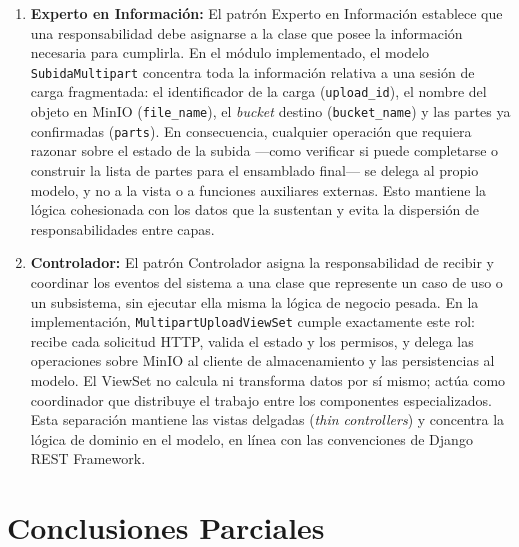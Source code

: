 \begin{enumerate}
\begin{lstlisting}[language=Python, caption={Validación de transiciones de estado}]
if upload.status == 'completed' or upload.status == 'cancelada':
    return Response({"error": "Subida culminada"},
                    status=status.HTTP_400_BAD_REQUEST)
\end{lstlisting}

  Este patrón garantiza la consistencia del estado de las sesiones y previene operaciones inválidas
  sobre subidas ya finalizadas o canceladas.

  \item \textbf{Experto en Información:} El patrón Experto en Información
  \citep{Larman2004} establece que una responsabilidad debe asignarse a la clase que
  posee la información necesaria para cumplirla. En el módulo implementado, el modelo
  \texttt{SubidaMultipart} concentra toda la información relativa a una sesión de
  carga fragmentada: el identificador de la carga (\texttt{upload\_id}), el nombre
  del objeto en MinIO (\texttt{file\_name}), el \textit{bucket} destino
  (\texttt{bucket\_name}) y las partes ya confirmadas (\texttt{parts}). En
  consecuencia, cualquier operación que requiera razonar sobre el estado de la subida
  ---como verificar si puede completarse o construir la lista de partes para el
  ensamblado final--- se delega al propio modelo, y no a la vista o a funciones
  auxiliares externas. Esto mantiene la lógica cohesionada con los datos que la
  sustentan y evita la dispersión de responsabilidades entre capas.

  \item \textbf{Controlador:} El patrón Controlador \citep{Larman2004} asigna
  la responsabilidad de recibir y coordinar los eventos del sistema a una clase que
  represente un caso de uso o un subsistema, sin ejecutar ella misma la lógica de
  negocio pesada. En la implementación, \texttt{MultipartUploadViewSet} cumple
  exactamente este rol: recibe cada solicitud HTTP, valida el estado y los permisos,
  y delega las operaciones sobre MinIO al cliente de almacenamiento y las
  persistencias al modelo. El ViewSet no calcula ni transforma datos por sí mismo;
  actúa como coordinador que distribuye el trabajo entre los componentes especializados.
  Esta separación mantiene las vistas delgadas (\textit{thin controllers}) y concentra
  la lógica de dominio en el modelo, en línea con las convenciones de Django REST
  Framework.
\end{enumerate}

\section{Conclusiones Parciales}

